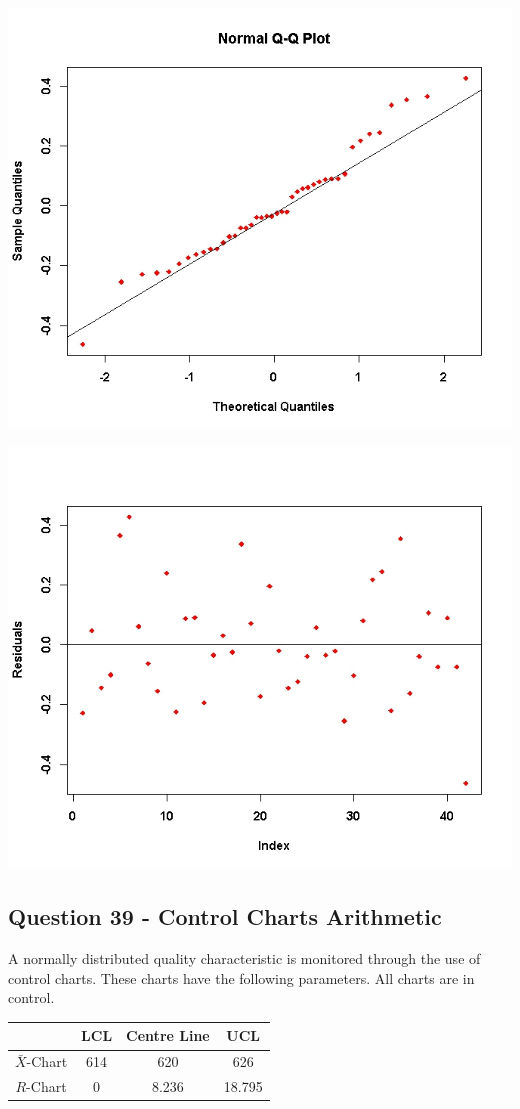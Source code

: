 \documentclass[a4paper,12pt]{article}
\begin{document}
\begin{center}
	\includegraphics[scale=0.55]{images/ExamQ5qqplot}
\end{center}
\begin{center}
	\includegraphics[scale=0.55]{images/ExamQ5resid}
\end{center}
\newpage



\subsection*{Question 39 - Control Charts Arithmetic}
A normally distributed quality characteristic is monitored through the use of control charts. These charts have the following parameters. All charts are in control.
\begin{center}
	\begin{tabular}{|c|c|c|c|}
		\hline  & LCL & Centre Line & UCL \\
		\hline $\bar{X}$-Chart & 614 & 620 & 626 \\
		\hline $R$-Chart & 0 & 8.236 & 18.795 \\ \hline
	\end{tabular}
\end{center}
\end{document}
